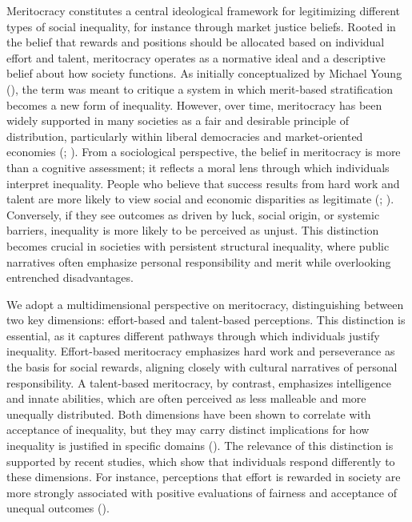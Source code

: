 \documentclass[
  12pt,
]{article}
\begin{document}
Meritocracy constitutes a central ideological framework for legitimizing
different types of social inequality, for instance through market
justice beliefs. Rooted in the belief that rewards and positions should
be allocated based on individual effort and talent, meritocracy operates
as a normative ideal and a descriptive belief about how society
functions. As initially conceptualized by Michael Young
(), the term was meant to critique a
system in which merit-based stratification becomes a new form of
inequality. However, over time, meritocracy has been widely supported in
many societies as a fair and desirable principle of distribution,
particularly within liberal democracies and market-oriented economies
(;
). From a sociological
perspective, the belief in meritocracy is more than a cognitive
assessment; it reflects a moral lens through which individuals interpret
inequality. People who believe that success results from hard work and
talent are more likely to view social and economic disparities as
legitimate (;
).
Conversely, if they see outcomes as driven by luck, social origin, or
systemic barriers, inequality is more likely to be perceived as unjust.
This distinction becomes crucial in societies with persistent structural
inequality, where public narratives often emphasize personal
responsibility and merit while overlooking entrenched disadvantages.

We adopt a multidimensional perspective on meritocracy, distinguishing
between two key dimensions: effort-based and talent-based perceptions.
This distinction is essential, as it captures different pathways through
which individuals justify inequality. Effort-based meritocracy
emphasizes hard work and perseverance as the basis for social rewards,
aligning closely with cultural narratives of personal responsibility. A
talent-based meritocracy, by contrast, emphasizes intelligence and
innate abilities, which are often perceived as less malleable and more
unequally distributed. Both dimensions have been shown to correlate with
acceptance of inequality, but they may carry distinct implications for
how inequality is justified in specific domains
().
The relevance of this distinction is supported by recent studies, which
show that individuals respond differently to these dimensions. For
instance, perceptions that effort is rewarded in society are more
strongly associated with positive evaluations of fairness and acceptance
of unequal outcomes ().
\end{document}
